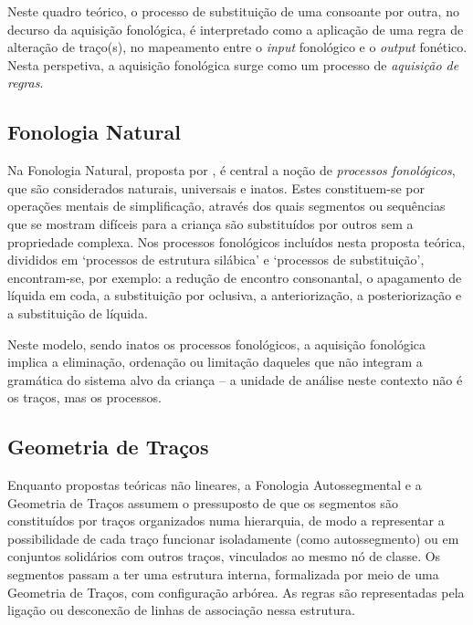 \documentclass[output=paper]{LSP/langsci}
\begin{document}
Neste quadro teórico, o processo de substituição de uma consoante por outra, no decurso da aquisição fonológica, é interpretado como a aplicação de uma regra de alteração de traço(s), no mapeamento entre o \textit{input} fonológico e o \textit{output} fonético. Nesta perspetiva, a aquisição fonológica surge como um processo de \textit{aquisição de regras}. 

\subsection{Fonologia Natural \citep{stampe1973}}
\label{subsec:matzenauer_natural}

Na Fonologia Natural, proposta por \citet{stampe1973}, é central a noção de \textit{processos fonológicos}, que são considerados naturais, universais e inatos. Estes constituem-se por operações mentais de simplificação, através dos quais segmentos ou sequências que se mostram difíceis para a criança são substituídos por outros sem a propriedade complexa. Nos processos fonológicos incluídos nesta proposta teórica, divididos em `processos de estrutura silábica' e `processos de substituição', encontram-se, por exemplo: a redução de encontro consonantal, o apagamento de líquida em coda, a substituição por oclusiva, a anteriorização, a posteriorização e a substituição de líquida.

Neste modelo, sendo inatos os processos fonológicos, a aquisição fonológica implica a eliminação, ordenação ou limitação daqueles que não integram a gramática do sistema alvo da criança -- a unidade de análise neste contexto não é os traços, mas os processos.

\subsection{Geometria de Traços \citep{clements1985,clementshume1995}}
\label{subsec:matzenauer_geometria}

Enquanto propostas teóricas não lineares, a Fonologia Autossegmental e a Geometria de Traços assumem o pressuposto de que os segmentos são constituídos por traços organizados numa hierarquia, de modo a representar a possibilidade de cada traço funcionar isoladamente (como autossegmento) ou em conjuntos solidários com outros traços, vinculados ao mesmo nó de classe. Os segmentos passam a ter uma estrutura interna, formalizada por meio de uma Geometria de Traços, com configuração arbórea. As regras são representadas pela ligação ou desconexão de linhas de associação nessa estrutura.
\end{document}

